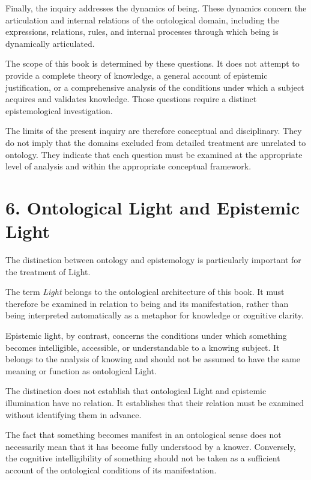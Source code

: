 Finally, the inquiry addresses the dynamics of being.
These dynamics concern the articulation and internal
relations of the ontological domain, including the
expressions, relations, rules, and internal processes
through which being is dynamically articulated.

The scope of this book is determined by these questions.
It does not attempt to provide a complete theory of
knowledge, a general account of epistemic justification,
or a comprehensive analysis of the conditions under
which a subject acquires and validates knowledge. Those
questions require a distinct epistemological investigation.

The limits of the present inquiry are therefore
conceptual and disciplinary. They do not imply that
the domains excluded from detailed treatment are
unrelated to ontology. They indicate that each question
must be examined at the appropriate level of analysis
and within the appropriate conceptual framework.


\section*{6. Ontological Light and Epistemic Light}

The distinction between ontology and epistemology is
particularly important for the treatment of Light.

The term \textit{Light} belongs to the ontological
architecture of this book. It must therefore be examined
in relation to being and its manifestation, rather than
being interpreted automatically as a metaphor for
knowledge or cognitive clarity.

Epistemic light, by contrast, concerns the conditions
under which something becomes intelligible, accessible,
or understandable to a knowing subject. It belongs
to the analysis of knowing and should not be assumed
to have the same meaning or function as ontological Light.

The distinction does not establish that ontological
Light and epistemic illumination have no relation.
It establishes that their relation must be examined
without identifying them in advance.

The fact that something becomes manifest in an
ontological sense does not necessarily mean that it
has become fully understood by a knower. Conversely,
the cognitive intelligibility of something should not
be taken as a sufficient account of the ontological
conditions of its manifestation.

